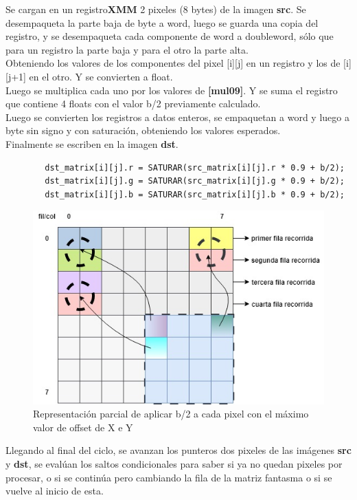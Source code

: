 Se cargan en un registro\textbf{XMM} 2 pixeles (8 bytes) de la imagen \textbf{src}.
Se desempaqueta la parte baja de byte a word, luego se guarda una copia del registro, y se desempaqueta cada componente de word a doubleword, sólo que para un registro la parte baja y para el otro la parte alta. \\
Obteniendo los valores de los componentes del pixel [i][j] en un registro y los de [i][j+1] en el otro. Y se convierten a float. \\
Luego se multiplica cada uno por los valores de \textbf{[mul09]}. 
Y se suma el registro que contiene 4 floats con el valor b/2 previamente calculado. \\
Luego se convierten los registros a datos enteros, se empaquetan a word y luego a byte sin signo y con saturación, obteniendo los valores esperados. \\
Finalmente se escriben en la imagen \textbf{dst}.
\begin{codesnippet}
\begin{verbatim}
        dst_matrix[i][j].r = SATURAR(src_matrix[i][j].r * 0.9 + b/2);
        dst_matrix[i][j].g = SATURAR(src_matrix[i][j].g * 0.9 + b/2);
        dst_matrix[i][j].b = SATURAR(src_matrix[i][j].b * 0.9 + b/2);
\end{verbatim}
\end{codesnippet}
\begin{figure}[ht]
  \begin{center}
	\includegraphics[scale=0.5]{img/fantasma1.jpg}
	\caption{Representación parcial de aplicar b/2 a cada pixel con el máximo valor de offset de X e Y}
	\label{calcb}
  \end{center}
\end{figure}

Llegando al final del ciclo, se avanzan los punteros dos pixeles de las imágenes \textbf{src} y \textbf{dst}, se evalúan los saltos condicionales para saber si ya no quedan pixeles por procesar, o si se continúa pero cambiando la fila de la matriz fantasma o si se vuelve al inicio de esta.

\newpage